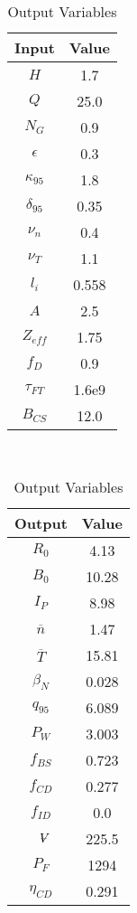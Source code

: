 \begin{table}[b!]
\centering
\caption{Charybdis Variables}
\hfill
\begin{subtable}[t]{0.4\textwidth}
\centering
\caption{Input Variables} ~\\
\begin{tabular}{ c|c }

Input            & Value           \\
\hline
$H$              & 1.7              \\
$Q$              & 25.0             \\
$N_{G}$          & 0.9              \\
$\epsilon$       & 0.3              \\
$\kappa_{95}$    & 1.8              \\
$\delta_{95}$    & 0.35             \\
$\nu_{n}$        & 0.4              \\
$\nu_{T}$        & 1.1              \\
$l_{i}$          & 0.558         \\
$A$              & 2.5              \\
$Z_{eff}$        & 1.75             \\
$f_{D}$          & 0.9              \\
$\tau_{FT}$      & 1.6e9            \\
$B_{CS}$         & 12.0             \\

\end{tabular}
\end{subtable}
\hfill
\begin{subtable}[t]{0.5\textwidth}
\centering
\caption{Output Variables} ~\\
\begin{tabular}{ c|c }

Output           & Value       \\
\hline
$R_{0}$          & 4.13            \\
$B_{0}$          & 10.28            \\
$I_{P}$          & 8.98            \\
$\overline n$    & 1.47            \\
$\overline T$    & 15.81           \\
$\beta_{N}$       & 0.028            \\
$q_{95}$         & 6.089            \\
$P_{W}$          & 3.003            \\
$f_{BS}$         & 0.723           \\
$f_{CD}$         & 0.277           \\
$f_{ID}$         & 0.0              \\
$\volume$         & 225.5            \\
$P_{F}$          & 1294           \\
$\eta_{CD}$      & 0.291           \\


\end{tabular}
\end{subtable}
\end{table}
